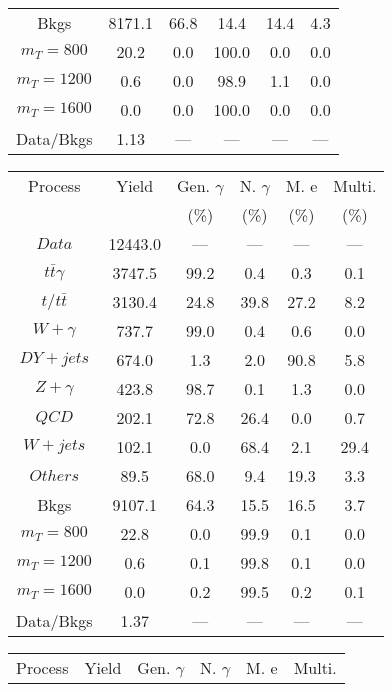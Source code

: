 \begin{figure}
\begin{minipage}[c]{0.32\textwidth}
{\begin{tabular}{cccccc}
Bkgs &  8171.1 &  66.8 &  14.4 &  14.4 &  4.3\\
$ m_{T} = 800 $ &  20.2 &  0.0 &  100.0 &  0.0 &  0.0\\
$ m_{T} = 1200 $ &  0.6 &  0.0 &  98.9 &  1.1 &  0.0\\
$ m_{T} = 1600 $ &  0.0 &  0.0 &  100.0 &  0.0 &  0.0\\
Data/Bkgs &  1.13 &  --- &  --- &  --- &  ---\\
\hline
\end{tabular}
}
\end{minipage}
\begin{minipage}[c]{0.32\textwidth}
\centering
\tiny{
\begin{tabular}{cccccc}
\hline
Process & Yield & Gen. $\gamma$ & N. $\gamma$ & M. e & Multi. \\
 &  & (\%) & (\%) & (\%) & (\%)  \\
\hline
                                                                      $ Data $ &  12443.0 &  --- &  --- &  --- &  ---\\
$ t\bar{t}\gamma $ &  3747.5 &  99.2 &  0.4 &  0.3 &  0.1\\
$ t/t\bar{t} $ &  3130.4 &  24.8 &  39.8 &  27.2 &  8.2\\
$ W+\gamma $ &  737.7 &  99.0 &  0.4 &  0.6 &  0.0\\
$ DY+jets $ &  674.0 &  1.3 &  2.0 &  90.8 &  5.8\\
$ Z+\gamma $ &  423.8 &  98.7 &  0.1 &  1.3 &  0.0\\
$ QCD $ &  202.1 &  72.8 &  26.4 &  0.0 &  0.7\\
$ W+jets $ &  102.1 &  0.0 &  68.4 &  2.1 &  29.4\\
$ Others $ &  89.5 &  68.0 &  9.4 &  19.3 &  3.3\\
Bkgs &  9107.1 &  64.3 &  15.5 &  16.5 &  3.7\\
$ m_{T} = 800 $ &  22.8 &  0.0 &  99.9 &  0.1 &  0.0\\
$ m_{T} = 1200 $ &  0.6 &  0.1 &  99.8 &  0.1 &  0.0\\
$ m_{T} = 1600 $ &  0.0 &  0.2 &  99.5 &  0.2 &  0.1\\
Data/Bkgs &  1.37 &  --- &  --- &  --- &  ---\\
\hline
\end{tabular}
}
\end{minipage}
\begin{minipage}[c]{0.32\textwidth}
\centering
\tiny{
\begin{tabular}{cccccc}
\hline
Process & Yield & Gen. $\gamma$ & N. $\gamma$ & M. e & Multi. \\

\end{tabular}}
\end{minipage}
\end{figure}
